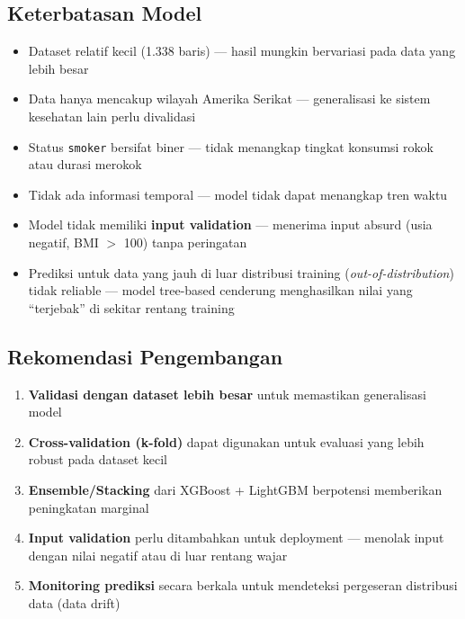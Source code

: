 \documentclass[12pt,a4paper]{article}
\begin{document}
\subsection{Keterbatasan Model}
\begin{itemize}
    \item Dataset relatif kecil (1.338 baris) — hasil mungkin bervariasi pada data yang lebih besar
    \item Data hanya mencakup wilayah Amerika Serikat — generalisasi ke sistem kesehatan lain perlu divalidasi
    \item Status \texttt{smoker} bersifat biner — tidak menangkap tingkat konsumsi rokok atau durasi merokok
    \item Tidak ada informasi temporal — model tidak dapat menangkap tren waktu
    \item Model tidak memiliki \textbf{input validation} — menerima input absurd (usia negatif, BMI $>$ 100) tanpa peringatan
    \item Prediksi untuk data yang jauh di luar distribusi training (\textit{out-of-distribution}) tidak reliable — model tree-based cenderung menghasilkan nilai yang ``terjebak'' di sekitar rentang training
\end{itemize}

\subsection{Rekomendasi Pengembangan}
\begin{enumerate}
    \item \textbf{Validasi dengan dataset lebih besar} untuk memastikan generalisasi model
    \item \textbf{Cross-validation (k-fold)} dapat digunakan untuk evaluasi yang lebih robust pada dataset kecil
    \item \textbf{Ensemble/Stacking} dari XGBoost + LightGBM berpotensi memberikan peningkatan marginal
    \item \textbf{Input validation} perlu ditambahkan untuk deployment — menolak input dengan nilai negatif atau di luar rentang wajar
    \item \textbf{Monitoring prediksi} secara berkala untuk mendeteksi pergeseran distribusi data (data drift)
\end{enumerate}
\end{document}
